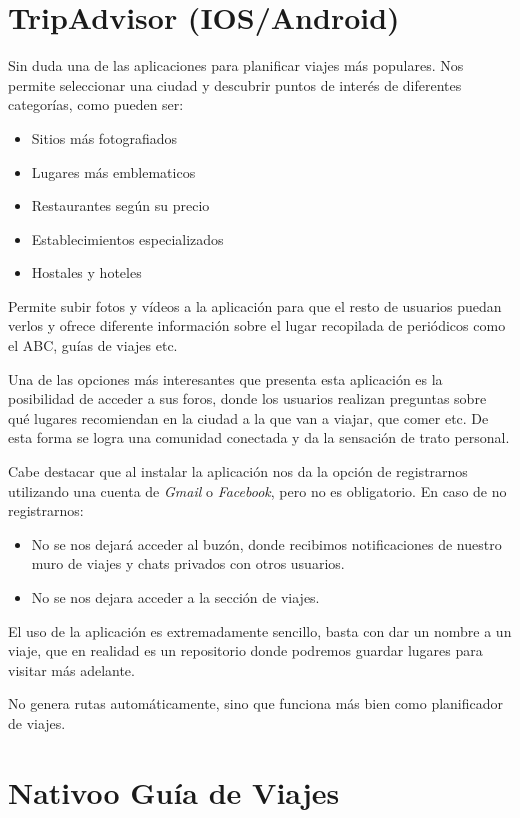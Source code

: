 
\section{TripAdvisor (IOS/Android)}
Sin duda una de las aplicaciones para planificar viajes más populares. Nos permite seleccionar una ciudad y descubrir puntos de interés de diferentes categorías, como pueden ser:
\begin{itemize}
\item Sitios más fotografiados
\item Lugares más emblematicos
\item Restaurantes según su precio
\item Establecimientos especializados
\item Hostales y hoteles
\end{itemize}

Permite subir fotos y vídeos a la aplicación para que el resto de usuarios puedan verlos y ofrece diferente información sobre el lugar recopilada de periódicos como el ABC, guías de viajes etc.

Una de las opciones más interesantes que presenta esta aplicación es la posibilidad de acceder a sus foros, donde los usuarios realizan preguntas sobre qué lugares recomiendan en la ciudad a la que van a viajar, que comer etc. De esta forma se logra una comunidad conectada y da la sensación de trato personal.

Cabe destacar que al instalar la aplicación nos da la opción de registrarnos utilizando una cuenta de \textit{Gmail} o \textit{Facebook}, pero no es obligatorio. En caso de no registrarnos:
\begin{itemize}
\item No se nos dejará acceder al buzón, donde recibimos notificaciones de nuestro muro de viajes y chats privados con otros usuarios.
\item No se nos dejara acceder a la sección de viajes.
\end{itemize} 

El uso de la aplicación es extremadamente sencillo, basta con dar un nombre a un viaje, que en realidad es un repositorio donde podremos guardar lugares para visitar más adelante.

No genera rutas automáticamente, sino que funciona más bien como planificador de viajes.

\section{Nativoo Guía de Viajes}










